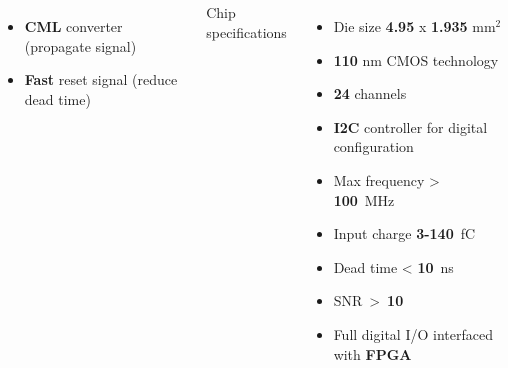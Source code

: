 \documentclass[aspectratio=169]{beamer}
\begin{document}
\begin{frame}
\begin{columns}
\begin{columns}
{\begin{itemize}
				\item \textbf{CML} converter (propagate signal)
				\item \textbf{Fast} reset signal (reduce dead time)
			\end{itemize} }
			{\color{blue} Chip specifications }
			\begin{itemize}
				\item Die size \textbf{4.95 }x \textbf{1.935} mm$^2$
				\item \textbf{110} nm CMOS technology
				\item \textbf{24} channels
				\item \textbf{I2C} controller for digital configuration
				\item Max frequency > \textbf{100}~MHz
				\item Input charge \textbf{3-140}~fC
				\item Dead time < \textbf{10}~ns
				\item SNR~>~\textbf{10}
				\item Full digital I/O interfaced \\ with \textbf{FPGA}
			\end{itemize}
		\end{columns}
	\end{columns}
	\end{frame}

		
\end{document}
